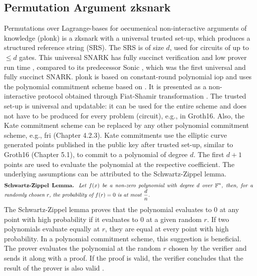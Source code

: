 \subsection{Permutation Argument \acrshort{zksnark}}
Permutations over Lagrange-bases for oecumenical non-interactive arguments of knowledge (\acrshort{plonk}) is a \acrshort{zksnark} with a universal trusted set-up, which produces a structured reference string (SRS). The SRS is of size \(d\), used for circuits of up to \(\leq d\) gates. This universal SNARK has fully succinct verification and low prover run time \citep{PLONKcryptoeprint:2019/953}, compared to its predecessor Sonic \citep{SONIC10.1145/3319535.3339817}, which was the first universal and fully succinct SNARK. \acrshort{plonk} is based on constant-round polynomial \acrshort{iop} and uses the polynomial commitment scheme based on \citet{Kate2010ConstantSizeCT}. It is presented as a non-interactive protocol obtained through Fiat-Shamir transformation \citep{PLONKcryptoeprint:2019/953}. The trusted set-up is universal and updatable: it can be used for the entire scheme and does not have to be produced for every problem (circuit), e.g., in Groth16. Also, the Kate commitment scheme can be replaced by any other polynomial commitment scheme, e.g., \acrshort{fri} (Chapter 4.2.3). 
Kate commitments use the elliptic curve generated points published in the public key after trusted set-up, similar to Groth16 (Chapter 5.1), to commit to a polynomial of degree \(d\). The first \(d+1\) points are used to evaluate the polynomial at the respective coefficient. The underlying assumptions can be attributed to the Schwartz-Zippel lemma.
\begin{align*}
    \text{\parbox{450pt}{\textbf{Schwartz-Zippel Lemma.} \textit{Let \(f(x)\) be a non-zero polynomial with degree \(d\) over \begin{math}\mathbb{F}^n\end{math}, then, for a randomly chosen \(r\), the probability of \(f(r) = 0\) is at most \(\frac{d}{n}\).}}}
\end{align*}
The Schwartz-Zippel lemma proves that the polynomial evaluates to 0 at any point with high probability if it evaluates to 0 at a given random \(r\). If two polynomials evaluate equally at \(r\), they are equal at every point with high probability. In a polynomial commitment scheme, this suggestion is beneficial. The prover evaluates the polynomial at the random \(r\) chosen by the verifier and sends it along with a proof. If the proof is valid, the verifier concludes that the result of the prover is also valid \citep{Kate2010ConstantSizeCT}.

